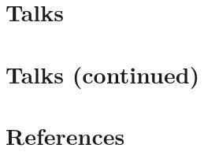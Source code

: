 \documentclass[margin,line]{resume}
\begin{document}
\begin{resume}
    \section{\mysidestyle Talks}


    \newcommand\vsp{-1.5mm}
    \newcommand\talkurl[5]{\noindent \textsl{#1} \href{#4}{#5} \hfill #2 \\ #3}
    \newcommand\talk[3]{\noindent \textsl{#1}\hfill #2 \\ #3}


    


    \newpage

    \section{\mysidestyle Talks (continued)}
    

    \vskip1cm

    \section{\mysidestyle References} 

    



\end{resume}
\end{document}
